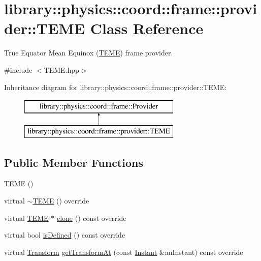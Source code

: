 \hypertarget{classlibrary_1_1physics_1_1coord_1_1frame_1_1provider_1_1_t_e_m_e}{}\section{library\+:\+:physics\+:\+:coord\+:\+:frame\+:\+:provider\+:\+:T\+E\+ME Class Reference}
\label{classlibrary_1_1physics_1_1coord_1_1frame_1_1provider_1_1_t_e_m_e}


True Equator Mean Equinox (\hyperlink{classlibrary_1_1physics_1_1coord_1_1frame_1_1provider_1_1_t_e_m_e}{T\+E\+ME}) frame provider.  




{\ttfamily \#include $<$T\+E\+M\+E.\+hpp$>$}

Inheritance diagram for library\+:\+:physics\+:\+:coord\+:\+:frame\+:\+:provider\+:\+:T\+E\+ME\+:\begin{figure}[H]
\begin{center}
\leavevmode
\includegraphics[height=2.000000cm]{classlibrary_1_1physics_1_1coord_1_1frame_1_1provider_1_1_t_e_m_e}
\end{center}
\end{figure}
\subsection*{Public Member Functions}
\begin{DoxyCompactItemize}
\item 
\hyperlink{classlibrary_1_1physics_1_1coord_1_1frame_1_1provider_1_1_t_e_m_e_a2b7c35dac37e2c95c280762b3c4d5f1a}{T\+E\+ME} ()
\item 
virtual \hyperlink{classlibrary_1_1physics_1_1coord_1_1frame_1_1provider_1_1_t_e_m_e_a945c6d66994dad1572e0895111fcfaba}{$\sim$\+T\+E\+ME} () override
\item 
virtual \hyperlink{classlibrary_1_1physics_1_1coord_1_1frame_1_1provider_1_1_t_e_m_e}{T\+E\+ME} $\ast$ \hyperlink{classlibrary_1_1physics_1_1coord_1_1frame_1_1provider_1_1_t_e_m_e_a606d0c4cad7df776e848fd3670e5cc7f}{clone} () const override
\item 
virtual bool \hyperlink{classlibrary_1_1physics_1_1coord_1_1frame_1_1provider_1_1_t_e_m_e_a8c52ea8c59a669197234383e4bfa54b6}{is\+Defined} () const override
\item 
virtual \hyperlink{classlibrary_1_1physics_1_1coord_1_1_transform}{Transform} \hyperlink{classlibrary_1_1physics_1_1coord_1_1frame_1_1provider_1_1_t_e_m_e_a78bd46fa8118d7220ab16a4ca2195299}{get\+Transform\+At} (const \hyperlink{classlibrary_1_1physics_1_1time_1_1_instant}{Instant} \&an\+Instant) const override
\end{DoxyCompactItemize}


